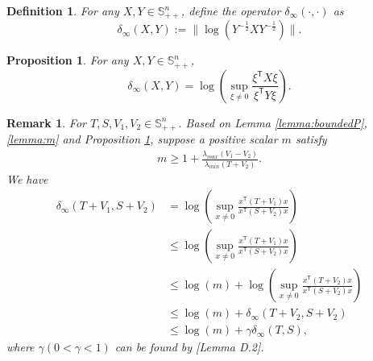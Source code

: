 \documentclass[letterpaper, 10 pt, conference]{ieeeconf}  %
\newcommand{\transpose}{\mathsf{T}}
\newcommand{\quadinner}[1]{x^{\transpose}(#1)x}
\newtheorem{definition}{Definition}
\newtheorem{proposition}{Proposition}
\newtheorem{remark}{Remark}
\begin{document}
\begin{definition}
    For any $X,Y\in \mathbb{S}_{++}^{n}$, define the operator $\delta_{\infty}(\cdot, \cdot)$ as
    \begin{equation*}
        \delta_{\infty}(X, Y) := \| \log(Y^{-\frac{1}{2}}XY^{-\frac{1}{2}})\|.
    \end{equation*}
\end{definition}

\begin{proposition}\label{proposition:deltaRatio}
    For any $X,Y\in \mathbb{S}_{++}^{n}$,
    \begin{equation}
        \delta_{\infty}(X,Y) = \log(\sup_{\xi\neq0} \frac{\xi^{\transpose}X\xi}{\xi^{\transpose}Y\xi}).
    \end{equation}
\end{proposition}

\begin{remark}\label{remark:delta}
    For $T,S,V_{1},V_{2}\in \mathbb{S}_{++}^{n}$. Based on Lemma \ref{lemma:boundedP},\ref{lemma:m} and Proposition \ref{proposition:deltaRatio}, suppose a positive scalar $m$ satisfy
    \begin{align*}
        m \geq 1+\frac{\lambda_{max}(V_{1}-V_{2})}{\lambda_{min}(T+V_{2})}.
    \end{align*}
    We have
    \begin{align*}
        \delta_{\infty}(T+V_{1},S+V_{2}) &= \log( \sup_{x\neq 0} \frac{\quadinner{T+V_{1}}}{\quadinner{S+V_{2}}})\\
        &\leq \log(\sup_{x\neq 0} \frac{\quadinner{T+V_{1}}}{\quadinner{S+V_{2}}})\\
        &\leq \log(m)+\log(\sup_{x\neq 0} \frac{\quadinner{T+V_{2}}}{\quadinner{S+V_{2}}})\\
        &\leq \log(m) + \delta_{\infty}(T+V_{2},S+V_{2})\\
        &\leq \log(m) + \gamma\delta_{\infty}(T,S),
    \end{align*}
    where $\gamma(0<\gamma<1)$ can be found by \cite{krauth_finite-time_2019}[Lemma D.2].
\end{remark}
\end{document}
